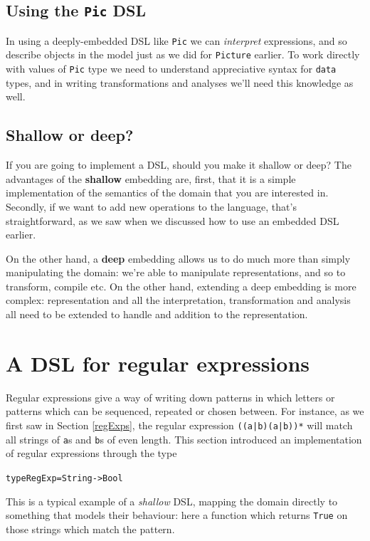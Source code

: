 \subsection*{Using the \texttt{Pic} DSL}

In using a deeply-embedded DSL like \texttt{Pic} we can \emph{interpret} expressions, and so describe objects in the model just as we did for \texttt{Picture} earlier. To work directly with values of \texttt{Pic} type we need to understand appreciative syntax for \texttt{data} types, and in writing transformations and analyses we'll need this knowledge as well.


\subsection*{Shallow or deep?}

If you are going to implement a DSL, should you make it shallow or deep? The advantages of the \textbf{shallow} embedding are, first, that it is a simple implementation of the semantics of the domain that you are interested in. Secondly, if we want to add new operations to the language, that's straightforward, as we saw when we discussed how to use an embedded DSL earlier. 

On the other hand, a \textbf{deep} embedding allows us to do much more than simply manipulating the domain: we're able to manipulate representations, and so to transform, compile etc. On the other hand, extending a deep embedding is more complex: representation and all the interpretation, transformation and analysis all need to be extended to handle and addition to the representation. 

\section{A DSL for regular expressions}

Regular expressions give a way of writing down patterns in which letters or patterns which can be sequenced, repeated or chosen between. For instance, as we first saw in Section \ref{regExps}, the regular expression \texttt{((a|b)(a|b))*} will match all strings of \texttt{a}s and \texttt{b}s of even length. This section introduced an implementation of regular expressions through the type
\begin{alltt}
type RegExp = String -> Bool
\end{alltt}
This is a typical example of a \emph{shallow} DSL, mapping the domain directly to something that models their behaviour: here a function which returns \texttt{True} on those strings which match the pattern. 

